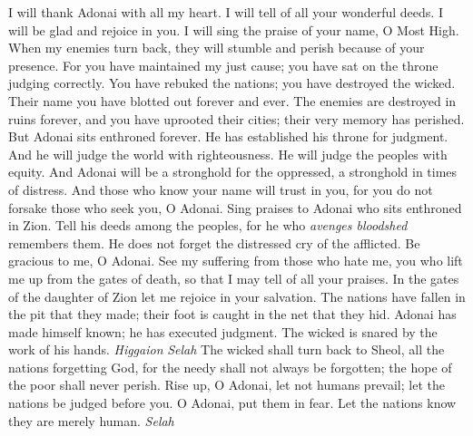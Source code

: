\begin{biblechapter} %
 I will thank Adonai with all my heart. 
I will tell of all your wonderful deeds.
\verse I will be glad and rejoice in you. 
I will sing the praise of your name, O Most High.
\verse When my enemies turn back, 
they will stumble and perish because of your presence.
\verse For you have maintained my just cause; 
you have sat on the throne judging correctly.
\verse You have rebuked the nations; 
you have destroyed the wicked. 
Their name you have blotted out 
forever and ever.
\verse The enemies are destroyed in ruins forever, 
and you have uprooted their cities; 
their very memory has perished.
\verse But Adonai sits enthroned forever. 
He has established his throne for judgment.
\verse And he will judge the world with righteousness. 
He will judge the peoples with equity.
\verse And Adonai will be a stronghold for the oppressed, 
a stronghold in times of distress.
\verse And those who know your name will trust in you, 
for you do not forsake those who seek you, O Adonai.
\verse Sing praises to Adonai who sits enthroned in Zion. 
Tell his deeds among the peoples,
\verse for he who \textit{avenges bloodshed} remembers them. 
He does not forget the distressed cry of the afflicted.
\verse Be gracious to me, O Adonai. 
See my suffering from those who hate me, 
you who lift me up from the gates of death,
\verse so that I may tell of all your praises. 
In the gates of the daughter of Zion 
let me rejoice in your salvation.
\verse The nations have fallen in the pit that they made; 
their foot is caught in the net that they hid.
\verse Adonai has made himself known; 
he has executed judgment. 
The wicked is snared by the work of his hands. \textit{Higgaion} \textit{Selah}
\verse The wicked shall turn back to Sheol, 
all the nations forgetting God,
\verse for the needy shall not always be forgotten; 
the hope of the poor shall never perish.
\verse Rise up, O Adonai, let not humans prevail; 
let the nations be judged before you.
\verse O Adonai, put them in fear. 
Let the nations know they are merely human. \textit{Selah}
\end{biblechapter}

